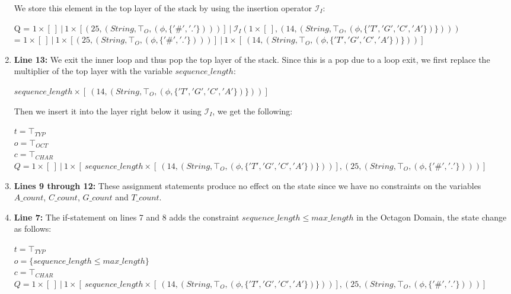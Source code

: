 \documentclass[10pt]{report}
\begin{document}
\begin{enumerate}
\begin{center}
	\end{center}
	We store this element in the top layer of the stack by using the insertion operator $ \mathcal{I}_{I} $:
	\begin{center}
		Q = $ 1 \times [\ ]\ \vert\ 1 \times [(25, (String, \top_{O}, (\phi, \lbrace '\#', '.' \rbrace)))]\ \vert\ \mathcal{I}_{I} (1 \times [\ ], (14, (String, \top_{O}, (\phi, \lbrace'T', 'G', 'C', 'A' \rbrace) \rbrace)))$\\
		= $ 1 \times [\ ]\ \vert\ 1 \times [(25, (String, \top_{O}, (\phi, \lbrace '\#', '.' \rbrace)))]\ \vert\ 1 \times [\ (14, (String, \top_{O}, (\phi, \lbrace'T', 'G', 'C', 'A' \rbrace) \rbrace))]$
	\end{center}
	\item \textbf{Line 13:} We exit the inner loop and thus pop the top layer of the stack. Since this is a pop due to a loop exit, we first replace the multiplier of the top layer with the variable $ sequence\_length $:
	\begin{center}
		$sequence\_length \times [\ (14, (String, \top_{O}, (\phi, \lbrace'T', 'G', 'C', 'A' \rbrace) \rbrace))]$
	\end{center}
	Then we insert it into the layer right below it using $ \mathcal{I}_{I} $, we get the following:
	\begin{center}
		$ t = \top_{TYP} $ \\
		$ o = \top_{OCT} $ \\
		$ c = \top_{CHAR} $ \\
		$ Q = 1 \times [\ ]\ \vert\ 1 \times [\ sequence\_length \times [\ (14, (String, \top_{O}, (\phi, \lbrace'T', 'G', 'C', 'A' \rbrace) \rbrace))], (25, (String, \top_{O}, (\phi, \lbrace '\#', '.' \rbrace)))]$
	\end{center}
	\item \textbf{Lines 9 through 12:} These assignment statements produce no effect on the state since we have no constraints on the variables $ A\_count $, $ C\_count $, $ G\_count $ and $ T\_count $. 
	\item \textbf{Line 7:} The if-statement on lines 7 and 8 adds the constraint $ sequence\_length \leq max\_length $ in the Octagon Domain, the state change as follows:
	\begin{center}
		$ t = \top_{TYP} $ \\
		$ o = \lbrace sequence\_length \leq max\_length \rbrace $\\
		$ c = \top_{CHAR} $ \\
		$ Q = 1 \times [\ ]\ \vert\ 1 \times [\ sequence\_length \times [\ (14, (String, \top_{O}, (\phi, \lbrace'T', 'G', 'C', 'A' \rbrace) \rbrace))], (25, (String, \top_{O}, (\phi, \lbrace '\#', '.' \rbrace)))]$

\end{center}
\end{enumerate}
\end{document}
